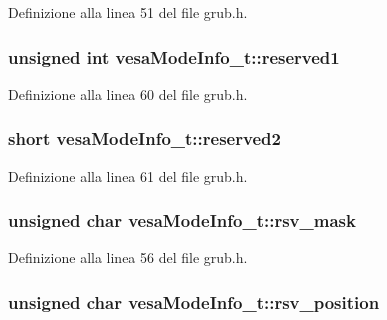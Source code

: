 Definizione alla linea 51 del file grub.\+h.

\hypertarget{structvesaModeInfo__t_aacef0071c533de26e708289e474a0542}{
\subsubsection[{reserved1}]{\setlength{\rightskip}{0pt plus 5cm}unsigned int vesa\+Mode\+Info\+\_\+t\+::reserved1}}\label{structvesaModeInfo__t_aacef0071c533de26e708289e474a0542}


Definizione alla linea 60 del file grub.\+h.

\hypertarget{structvesaModeInfo__t_a5ffbef6f6a9ac0ae6975827208b77ec5}{
\subsubsection[{reserved2}]{\setlength{\rightskip}{0pt plus 5cm}short vesa\+Mode\+Info\+\_\+t\+::reserved2}}\label{structvesaModeInfo__t_a5ffbef6f6a9ac0ae6975827208b77ec5}


Definizione alla linea 61 del file grub.\+h.

\hypertarget{structvesaModeInfo__t_a8b424620d78b885292f29849acfe962c}{
\subsubsection[{rsv\+\_\+mask}]{\setlength{\rightskip}{0pt plus 5cm}unsigned char vesa\+Mode\+Info\+\_\+t\+::rsv\+\_\+mask}}\label{structvesaModeInfo__t_a8b424620d78b885292f29849acfe962c}


Definizione alla linea 56 del file grub.\+h.

\hypertarget{structvesaModeInfo__t_a2af8762aa842598e8a6a33872a83b5ab}{
\subsubsection[{rsv\+\_\+position}]{\setlength{\rightskip}{0pt plus 5cm}unsigned char vesa\+Mode\+Info\+\_\+t\+::rsv\+\_\+position}}\label{structvesaModeInfo__t_a2af8762aa842598e8a6a33872a83b5ab}



